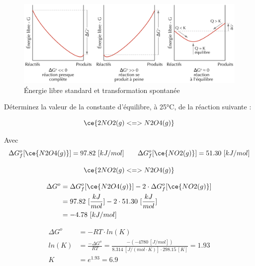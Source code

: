 \documentclass[
  11pt,
  a4paper,
  openany]{book}
\begin{document}
\begin{figure}

{\centering \includegraphics[width=1\linewidth]{images/dG-profile} 

}

\caption{Énergie libre standard et transformation spontanée}\label{fig:dG-profile}
\end{figure}

\clearpage

\begin{Exercise}

Déterminez la valeur de la constante d'équilibre, à 25°C, de la réaction suivante :

\[
\ce{2 NO2(g) <=> N2O4(g)}
\]

Avec
\[
\begin{split}
\Delta G^o_f[\ce{N2O4(g)}] = 97.82\ [kJ/mol]
\end{split}
\qquad
\begin{split}
\Delta G^o_f[\ce{NO2(g)}] = 51.30\ [kJ/mol]
\end{split}
\]


\end{Exercise}

\begin{Answer}

\[
\ce{2 NO2(g) <=> N2O4(g)}
\]

\[
\begin{split}
\Delta G^o &= \Delta G^o_f[\ce{N2O4(g)}] - 2 \cdot \Delta G^o_f[\ce{NO2(g)}] \\
&= 97.82\ [\frac{kJ}{mol}] - 2 \cdot 51.30\ [\frac{kJ}{mol}] \\
&= -4.78\ [kJ/mol]
\end{split}
\]

\[
\begin{split}
\Delta G^o &= - RT \cdot ln(K) \\
ln(K) &= \frac{- \Delta G^o}{RT} = \frac{- (-4780\ [J/mol])}{8.314\ [J/(mol \cdot K)] \cdot 298.15\ [K]} = 1.93 \\
K &= e^{1.93} = 6.9
\end{split}
\]

\clearpage

\end{Answer}
\end{document}
